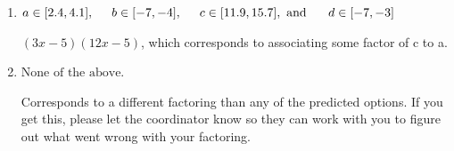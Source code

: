 \documentclass{extbook}[14pt]
\begin{document}
\begin{enumerate}
{\begin{enumerate}[label=\Alph*.]
* $(6x -5)(6x -5)$, which is the correct option.
\item \( a \in [2.4, 4.1], \hspace*{5mm} b \in [-7, -4], \hspace*{5mm} c \in [11.9, 15.7], \text{ and } \hspace*{5mm} d \in [-7, -3] \)

 $(3x -5)(12x -5)$, which corresponds to associating some factor of c to a.
\item \( \text{None of the above.} \)

 Corresponds to a different factoring than any of the predicted options. If you get this, please let the coordinator know so they can work with you to figure out what went wrong with your factoring.
\end{enumerate}

}
\end{enumerate}
\end{document}

